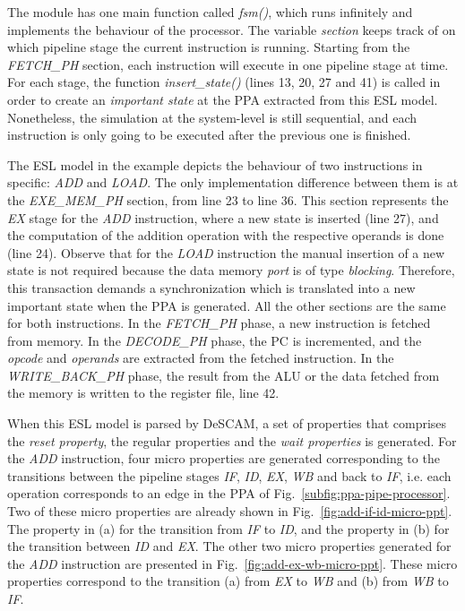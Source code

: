 The module has one main function called \textit{fsm()}, which runs infinitely and implements the behaviour of the processor. The variable \textit{section} keeps track of on which pipeline stage the current instruction is running. Starting from the \textit{FETCH\_PH} section, each instruction will execute in one pipeline stage at time. For each stage, the function \textit{insert\_state()} (lines 13, 20, 27 and 41) is called in order to create an \textit{important state} at the PPA extracted from this ESL model. Nonetheless, the simulation at the system-level is still sequential, and each instruction is only going to be executed after the previous one is finished.

The ESL model in the example depicts the behaviour of two instructions in specific: \textit{ADD} and \textit{LOAD}. The only implementation difference between them is at the \textit{EXE\_MEM\_PH} section, from line 23 to line 36. This section represents the \textit{EX} stage for the \textit{ADD} instruction, where a new state is inserted (line 27), and the computation of the addition operation with the respective operands is done (line 24). Observe that for the \textit{LOAD} instruction the manual insertion of a new state is not required because the data memory \textit{port} is of type \textit{blocking}. Therefore, this transaction demands a synchronization which is translated into a new important state when the PPA is generated. All the other sections are the same for both instructions. In the \textit{FETCH\_PH} phase, a new instruction is fetched from memory. In the \textit{DECODE\_PH} phase, the PC is incremented, and the \textit{opcode} and \textit{operands} are extracted from the fetched instruction. In the \textit{WRITE\_BACK\_PH} phase, the result from the ALU or the data fetched from the memory is written to the register file, line 42.

When this ESL model is parsed by DeSCAM, a set of properties that comprises the \textit{reset property}, the regular properties and the \textit{wait properties} is generated. For the \textit{ADD} instruction, four micro properties are generated corresponding to the transitions between the pipeline stages \textit{IF}, \textit{ID}, \textit{EX}, \textit{WB} and back to \textit{IF}, i.e. each operation corresponds to an edge in the PPA of Fig.~\ref{subfig:ppa-pipe-processor}. Two of these micro properties are already shown in Fig.~\ref{fig:add-if-id-micro-ppt}. The property in (a) for the transition from \textit{IF} to \textit{ID}, and the property in (b) for the transition between \textit{ID} and \textit{EX}. The other two micro properties generated for the \textit{ADD} instruction are presented in Fig.~\ref{fig:add-ex-wb-micro-ppt}. These micro properties correspond to the transition (a) from \textit{EX} to \textit{WB}  and (b) from \textit{WB} to \textit{IF}. 

